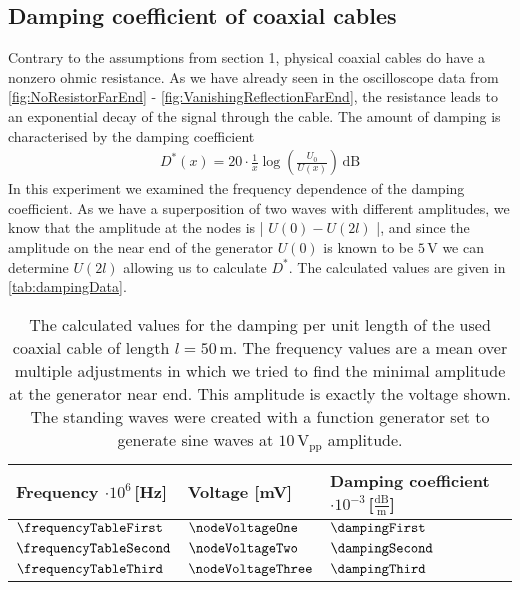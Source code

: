 \documentclass[a4paper,10pt,twocolumn]{article}
\begin{document}
    \subsection{Damping coefficient of coaxial cables}\label{subsec:dampingCoefficient}
    
    Contrary to the assumptions from section 1, physical coaxial cables do have a nonzero ohmic resistance.
    As we have already seen in the oscilloscope data from \autoref{fig:NoResistorFarEnd} - \autoref{fig:VanishingReflectionFarEnd}, the resistance leads to an exponential decay of the signal through the cable.
    The amount of damping is characterised by the damping coefficient
    \begin{align}
       D^*(x) = 20\cdot \frac{1}{x}\log(\frac{U_0}{U(x)})\,\text{dB} 
    \end{align}
    In this experiment we examined the frequency dependence of the damping coefficient.
    As we have a superposition of two waves with different amplitudes, we know that the amplitude at the nodes is | $U(0) - U(2l)$ |, and since the amplitude on the near end of the generator $U(0)$ is known to be $5\,$V
    we can determine $U(2l)$ allowing us to calculate $D^*$.
    The calculated values are given in \autoref{tab:dampingData}.
    \begin{table}
        \centering
        \fontsize{7pt}{8pt}\selectfont
        \begin{tabular*}{\linewidth}{@{\extracolsep{\fill}}lll}
    \hline  
    \hline
    \rule[-7pt]{0pt}{23pt}  Frequency $\cdot 10^6\,$[Hz]& Voltage [mV]& Damping coefficient $\cdot 10^{-3}\,$[$\frac{\text{dB}}{\text{m}}$]\\
    \hline
    \rule[-5pt]{0pt}{23pt}  $\frequencyTableFirst$ & $\nodeVoltageOne$& $ \dampingFirst $ \\
    \rule[-5pt]{0pt}{23pt}  $\frequencyTableSecond $ & $\nodeVoltageTwo$ & $ \dampingSecond $ \\
    \rule[-5pt]{0pt}{23pt}  $\frequencyTableThird$ &$\nodeVoltageThree$ & $\dampingThird $ \\
    \hline
    \hline   
        \end{tabular*}
        \caption[]{The calculated values for the damping per unit length of the used coaxial cable of length $l=50\,$m.
        The frequency values are a mean over multiple adjustments in which we tried to find the minimal amplitude at the generator near end.
        This amplitude is exactly the voltage shown.
        The standing waves were created with a function generator set to generate sine waves at $10\,\text{V}_{\text{pp}}$ amplitude.}
        \label{tab:dampingData}
    \end{table}
\end{document}
